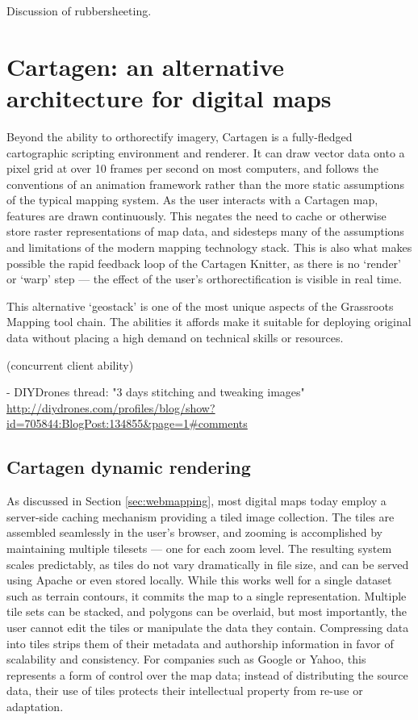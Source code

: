 \documentclass[11pt,oneside,notitlepage]{report}
\begin{document}
Discussion of rubbersheeting. \cite{white1985piecewise}

\section{Cartagen: an alternative architecture for digital maps}

Beyond the ability to orthorectify imagery, Cartagen is a fully-fledged cartographic scripting environment and renderer. It can draw vector data onto a pixel grid at over 10 frames per second on most computers, and follows the conventions of an animation framework rather than the more static assumptions of the typical mapping system. As the user interacts with a Cartagen map, features are drawn continuously. This negates the need to cache or otherwise store raster representations of map data, and sidesteps many of the assumptions and limitations of the modern mapping technology stack. This is also what makes possible the rapid feedback loop of the Cartagen Knitter, as there is no `render' or `warp' step --- the effect of the user's orthorectification is visible in real time. 

This alternative `geostack' is one of the most unique aspects of the Grassroots Mapping tool chain. The abilities it affords make it suitable for deploying original data without placing a high demand on technical skills or resources. 

(concurrent client ability)

- DIYDrones thread: "3 days stitching and tweaking images" \url{http://diydrones.com/profiles/blog/show?id=705844:BlogPost:134855&page=1#comments}

\subsection{Cartagen dynamic rendering}

As discussed in Section \ref{sec:webmapping}, most digital maps today employ a server-side caching mechanism providing a tiled image collection. The tiles are assembled seamlessly in the user's browser, and zooming is accomplished by maintaining multiple tilesets --- one for each zoom level. The resulting system scales predictably, as tiles do not vary dramatically in file size, and can be served using Apache or even stored locally. While this works well for a single dataset such as terrain contours, it commits the map to a single representation. Multiple tile sets can be stacked, and polygons can be overlaid, but most importantly, the user cannot edit the tiles or manipulate the data they contain. Compressing data into tiles strips them of their metadata and authorship information in favor of scalability and consistency. For companies such as Google or Yahoo, this represents a form of control over the map data; instead of distributing the source data, their use of tiles protects their intellectual property from re-use or adaptation. 
\end{document}
